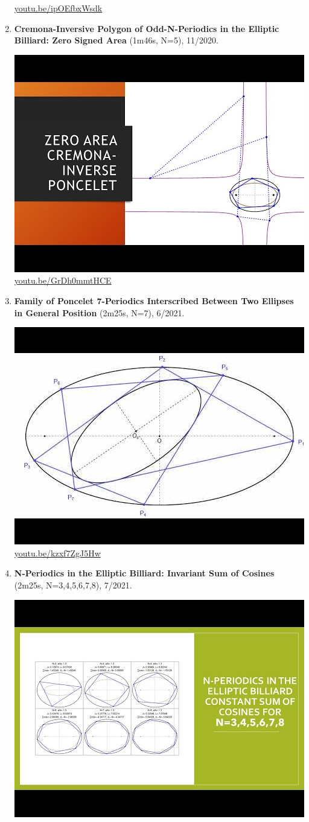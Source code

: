 \documentclass[12pt]{amsart}
\begin{document}
\begin{enumerate}[resume]
\begin{center}
\href{https://youtu.be/ipOEfbxWsdk}{\url{youtu.be/ipOEfbxWsdk}}\end{center}
% 
\item \textbf{Cremona-Inversive Polygon of Odd-N-Periodics in the Elliptic Billiard: Zero Signed Area} (1m46s, N=5), 11/2020. 
\begin{center}\includegraphics[width=.5\textwidth]{pics/GrDh0mmtHCE.jpg} \\ 
\href{https://youtu.be/GrDh0mmtHCE}{\url{youtu.be/GrDh0mmtHCE}}\end{center}
% 
\item \textbf{Family of Poncelet 7-Periodics Interscribed Between Two Ellipses in General Position} (2m25s, N=7), 6/2021. 
\begin{center}\includegraphics[width=.5\textwidth]{pics/kzxf7ZgJ5Hw.jpg} \\ 
\href{https://youtu.be/kzxf7ZgJ5Hw}{\url{youtu.be/kzxf7ZgJ5Hw}}\end{center}
% 
\item \textbf{N-Periodics in the Elliptic Billiard: Invariant Sum of Cosines} (2m25s, N=3,4,5,6,7,8), 7/2021. 
\begin{center}\includegraphics[width=.5\textwidth]{pics/qP67bdqS3nQ.jpg} \\ 

\end{center}
\end{enumerate}
\end{document}
